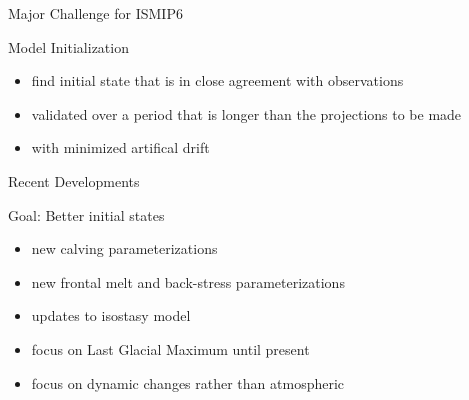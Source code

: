 \documentclass[hide notes,intlimits]{beamer}
\begin{document}
\begin{frame}{Major Challenge for ISMIP6}
  \begin{block}{Model Initialization}
    \begin{itemize}
    \item find initial state that is in close agreement with observations
    \item validated over a period that is longer than the projections to be made
    \item with minimized artifical drift
    \end{itemize}
  \end{block}
\end{frame}

\begin{frame}{Recent Developments}
  \begin{block}{Goal: Better initial states}
    \begin{itemize}
    \item new calving parameterizations
    \item new frontal melt and back-stress parameterizations
    \item updates to isostasy model
    \item focus on Last Glacial Maximum until present
    \item focus on dynamic changes rather than atmospheric
    \end{itemize}
  \end{block}
\end{frame}
\end{document}
